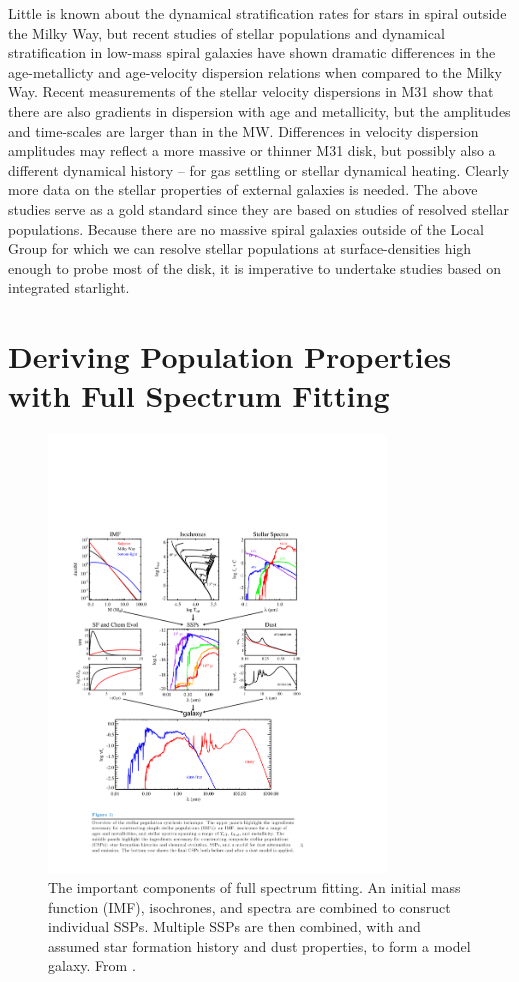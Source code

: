 Little is known about the dynamical stratification rates for stars in
spiral outside the Milky Way, but recent studies of stellar
populations and dynamical stratification in low-mass spiral galaxies
\citep{Seth05a,Bernard15} have shown dramatic differences in the
age-metallicty and age-velocity dispersion relations when compared to
the Milky Way. Recent measurements of the stellar velocity dispersions
in M31 \citep{Dorman15} show that there are also gradients in
dispersion with age and metallicity, but the amplitudes and
time-scales are larger than in the MW. Differences in velocity
dispersion amplitudes may reflect a more massive or thinner M31 disk,
but possibly also a different dynamical history -- for gas settling or
stellar dynamical heating. Clearly more data on the stellar properties
of external galaxies is needed. The above studies serve as a gold
standard since they are based on studies of resolved stellar
populations. Because there are no massive spiral galaxies outside of
the Local Group for which we can resolve stellar populations at
surface-densities high enough to probe most of the disk, it is
imperative to undertake studies based on integrated starlight.

\section{Deriving Population Properties with Full Spectrum Fitting}
\begin{figure}
  \centering
  \includegraphics[width=0.8\textwidth]{Introduction/figs/conroy_13.pdf}
  \caption[Schematic of full spectrum
  fitting]{\fixspacing\label{intro:fig:conroy}The important components
    of full spectrum fitting. An initial mass function (IMF),
    isochrones, and spectra are combined to consruct individual
    SSPs. Multiple SSPs are then combined, with and assumed star
    formation history and dust properties, to form a model
    galaxy. From \citet{Conroy13}.}
\end{figure}

